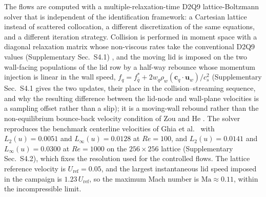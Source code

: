 \documentclass[11pt,a4paper]{article}
\begin{document}
The flows are computed with a multiple-relaxation-time D2Q9 lattice-Boltzmann
solver \cite{dhumieres2002mrt,chen1998doolen} that is independent of the
identification framework: a Cartesian lattice instead of scattered collocation, a
different discretization of the same equations, and a different iteration
strategy. Collision is performed in moment space with a diagonal relaxation
matrix whose non-viscous rates take the conventional D2Q9 values
(Supplementary Sec.~S4.1) \cite{lallemand2000theory}, and the moving lid is
imposed on the two wall-facing populations of the lid row by a half-way rebounce
whose momentum injection is linear in the wall speed, $f_q=f_{\bar q}^{*}+2w_q\rho_w(\mathbf{c}_q
\cdot\mathbf{u}_w)/c_s^2$ \cite{ladd1994} (Supplementary Sec.~S4.1 gives the two
updates, their place in the collision--streaming sequence, and why the resulting
difference between the lid-node and wall-plane velocities is a sampling offset rather
than a slip); it
is a moving-wall rebound rather than the non-equilibrium bounce-back velocity
condition of Zou and He \cite{zou1997pressure}. The solver reproduces the benchmark
centerline velocities of Ghia et al.~\cite{ghia1982high} with
$L_2(u)=0.0051$ and $L_\infty(u)=0.0128$ at $Re=100$, and
$L_2(u)=0.0141$ and $L_\infty(u)=0.0300$ at $Re=1000$ on the
$256\times256$ lattice (Supplementary Sec.~S4.2), which fixes the resolution used
for the controlled flows. The lattice reference velocity is
$U_{\mathrm{ref}}=0.05$, and the largest instantaneous lid speed imposed in the
campaign is $1.23\,U_{\mathrm{ref}}$, so the maximum Mach number is
$\mathrm{Ma}\approx0.11$, within the incompressible limit.
\end{document}
